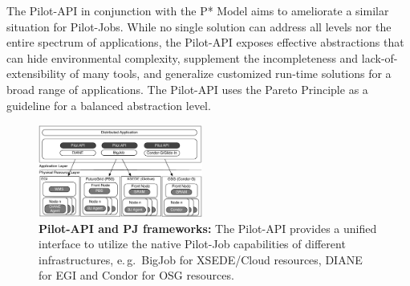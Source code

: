 \documentclass[conference,final]{IEEEtran}
\newcommand{\jhanote}[1]{ {\textcolor{red} { ***shantenu: #1 }}}
\newcommand{\amnote}[1]{ {\textcolor{blue} { ***andreM: #1 }}}
\newcommand{\amnote}[1]{}
\newcommand{\jhanote}[1]{}
\newcommand{\pilotjobs}{Pilot-Jobs\xspace}
\newcommand{\upp}{\vspace*{-0.5em}}
\begin{document}
The Pilot-API in conjunction with the P* Model aims to ameliorate a
similar situation for \pilotjobs. While no single solution can address
all levels nor the entire spectrum of applications, the Pilot-API
exposes effective abstractions that can hide environmental complexity,
supplement the incompleteness and lack-of-extensibility of many tools,
and generalize customized run-time solutions for a broad range of
applications.  The Pilot-API uses the Pareto Principle as a guideline
for a balanced abstraction level.



\begin{figure}[t]
    \centering
\upp
    \includegraphics[width=0.48\textwidth]{figures/distributed_pilot_job.pdf}
    \caption{\textbf{Pilot-API and PJ frameworks:} The Pilot-API provides 
      a unified interface to utilize the native Pilot-Job capabilities of
      different infrastructures, e.\,g.\ BigJob for XSEDE/Cloud
      resources, DIANE for EGI and Condor for OSG resources.
	\upp\upp\upp}
    \label{fig:figures_distributed_pilot_job}
\end{figure}

\end{document}
